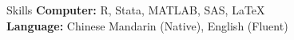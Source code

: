 \documentclass{resume_liang} %
\begin{document}





\begin{rSection}{Skills}
{\bf Computer:} R, Stata, MATLAB, SAS, LaTeX 
\vspace{0.1cm} \\
{\bf Language:} Chinese Mandarin (Native), English (Fluent) 
\end{rSection}
\bigskip  
\end{document}
